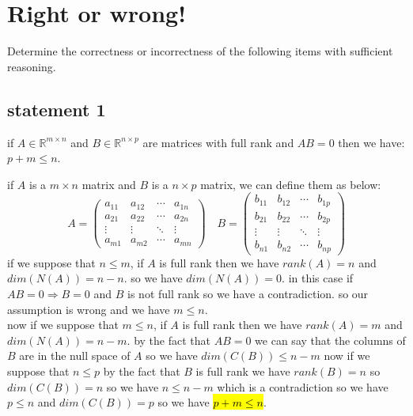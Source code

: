 \section{Right or wrong!}
Determine the correctness or incorrectness of the following items with sufficient reasoning.
\subsection{statement 1}
if $A \in \mathbb{R}^{m\times n}$ and $B \in \mathbb{R}^{n\times p}$ are matrices with full rank and $AB = 0$ then we have: $p + m \leq n$.
\begin{qsolve}
	\begin{qsolve}[]
		if $A$ is a $m\times n$ matrix and $B$ is a $n\times p$ matrix, we can define them as below:
		$$A = \begin{pmatrix}
			a_{11} & a_{12} & \cdots & a_{1n} \\
			a_{21} & a_{22} & \cdots & a_{2n} \\
			\vdots & \vdots & \ddots & \vdots \\
			a_{m1} & a_{m2} & \cdots & a_{mn}
		\end{pmatrix} \quad B = \begin{pmatrix}
			b_{11} & b_{12} & \cdots & b_{1p} \\
			b_{21} & b_{22} & \cdots & b_{2p} \\
			\vdots & \vdots & \ddots & \vdots \\
			b_{n1} & b_{n2} & \cdots & b_{np}
		\end{pmatrix}$$
		if we suppose that $n \leq m$, if $A$ is full rank then we have $rank(A) = n$ and $dim(N(A)) = n - n$. so we have $dim(N(A)) = 0$. in this case if $AB = 0 \Rightarrow B = 0$ and $B$ is not full rank so we have a contradiction. so our assumption is wrong and we have $m \leq n$.\\
		now if we suppose that $m \leq n$, if $A$ is full rank then we have $rank(A) = m$ and $dim(N(A)) = n - m$. by the fact that $AB = 0$ we can say that the columns of $B$ are in the null space of $A$ so we have $dim(C(B)) \leq n - m$ now if we suppose that $ n \leq p$ by the fact that $B$ is full rank we have $rank(B) = n$ so $dim(C(B)) = n$ so we have $n \leq n - m$ which is a contradiction so we have $p \leq n$ and $dim(C(B)) = p$ so we have \hl{$p + m \leq n$}.\\

	\end{qsolve}
\end{qsolve}
